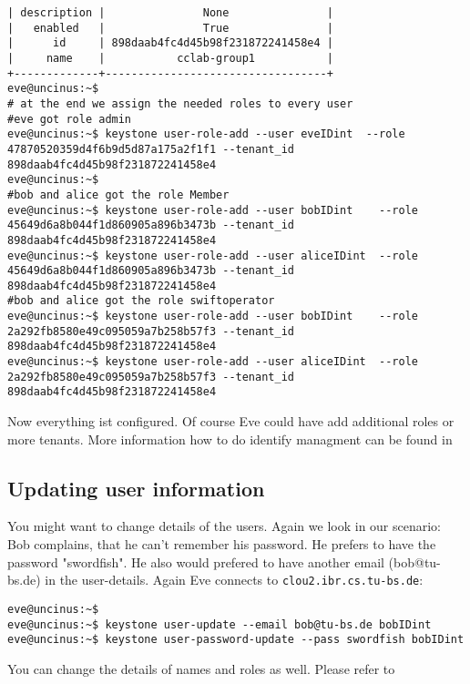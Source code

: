 \documentclass[a4paper,ngerman,bibtotocliststotoc]{scrartcl}
\begin{document}
\begin{verbatim}
| description |               None               |
|   enabled   |               True               |
|      id     | 898daab4fc4d45b98f231872241458e4 |
|     name    |           cclab-group1           |
+-------------+----------------------------------+
eve@uncinus:~$ 
# at the end we assign the needed roles to every user
#eve got role admin
eve@uncinus:~$ keystone user-role-add --user eveIDint  --role 47870520359d4f6b9d5d87a175a2f1f1 --tenant_id 898daab4fc4d45b98f231872241458e4
eve@uncinus:~$
#bob and alice got the role Member
eve@uncinus:~$ keystone user-role-add --user bobIDint    --role 45649d6a8b044f1d860905a896b3473b --tenant_id 898daab4fc4d45b98f231872241458e4
eve@uncinus:~$ keystone user-role-add --user aliceIDint  --role 45649d6a8b044f1d860905a896b3473b --tenant_id 898daab4fc4d45b98f231872241458e4
#bob and alice got the role swiftoperator
eve@uncinus:~$ keystone user-role-add --user bobIDint    --role 2a292fb8580e49c095059a7b258b57f3 --tenant_id 898daab4fc4d45b98f231872241458e4
eve@uncinus:~$ keystone user-role-add --user aliceIDint  --role 2a292fb8580e49c095059a7b258b57f3 --tenant_id 898daab4fc4d45b98f231872241458e4
\end{verbatim}
Now everything ist configured. Of course Eve could have add additional
roles or more tenants. More information how to do identify managment
can be found in %

\subsection{Updating user information}
\label{sec:updat-user-inform}
You might want to change details of the users. Again we look in our
scenario:
Bob complains, that he can't remember his password. He prefers to have
the password "swordfish". He also would prefered to have another email
(bob@tu-bs.de) in the user-details.
Again Eve connects to \verb|clou2.ibr.cs.tu-bs.de|:
\begin{verbatim}
eve@uncinus:~$
eve@uncinus:~$ keystone user-update --email bob@tu-bs.de bobIDint
eve@uncinus:~$ keystone user-password-update --pass swordfish bobIDint
\end{verbatim}
You can change the details of names and roles as well. Please refer to
\end{document}
